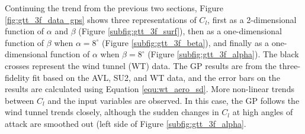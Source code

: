 Continuing the trend from the previous two sections, Figure \ref{fig:gtt_3f_data_gps} shows three representations of $C_l$, first as a 2-dimensional function of $\alpha$ and $\beta$ (Figure \ref{subfig:gtt_3f_surf}), then as a one-dimensional function of $\beta$ when $\alpha=8^\circ$ (Figure \ref{subfig:gtt_3f_beta}), and finally as a one-dimensional function of $\alpha$ when $\beta = 8^\circ$ (Figure \ref{subfig:gtt_3f_alpha}).
The black crosses represent the wind tunnel (WT) data.
The GP results are from the three-fidelity fit based on the AVL, SU2, and WT data, and the error bars on the results are calculated using Equation \ref{equ:wt_aero_sd}.
More non-linear trends between $C_l$ and the input variables are observed.
In this case, the GP follows the wind tunnel trends closely, although the sudden changes in $C_l$ at high angles of attack are smoothed out (left side of Figure \ref{subfig:gtt_3f_alpha}.

